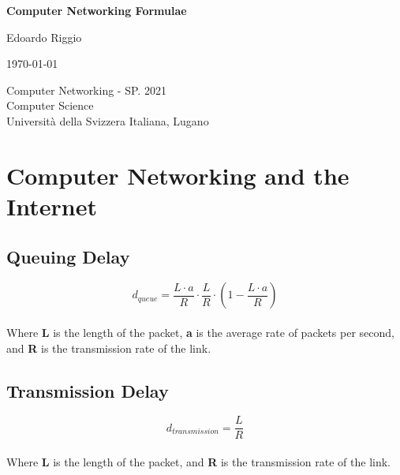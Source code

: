 \documentclass{article}
\begin{document}
\begin{titlepage}
    \begin{center}
        \vspace*{1cm}
        
        \Huge
        \textbf{Computer Networking Formulae}
        
        \vspace{0.5cm}
        \LARGE
        
        \vspace{.5cm}
        
        Edoardo Riggio
   		  \vspace{1.5cm}
       
        \vfill
        
        \today
        
        \vspace{.8cm}
          \Large
          Computer Networking - SP. 2021 \\
        Computer Science\\
        Universit\`{a} della Svizzera Italiana, Lugano\\
        
    \end{center}
\end{titlepage}

\tableofcontents

\newpage

\section{Computer Networking and the Internet}
\subsection{Queuing Delay}
\vspace{.3cm}
\[ d_{queue} = \frac{L \cdot a}{R} \cdot \frac{L}{R} \cdot \left( 1 - \frac{L \cdot a}{R} \right) \] \\
Where \textbf{L} is the length of the packet, \textbf{a} is the average rate of packets per second, and \textbf{R} is the transmission rate of the link.

\subsection{Transmission Delay}
\vspace{.3cm}
\[ d_{transmission} = \frac{L}{R} \] \\
Where \textbf{L} is the length of the packet, and \textbf{R} is the transmission rate of the link.
\end{document}
